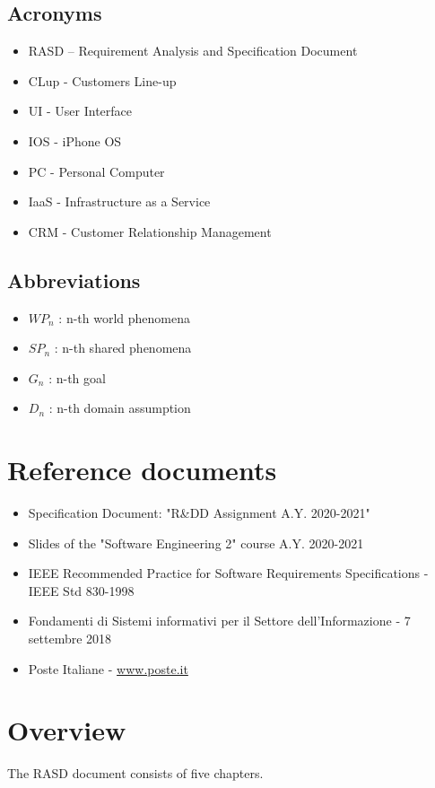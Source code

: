 \documentclass[a4paper,12pt]{book}
\begin{document}
\subsection{Acronyms}
\begin{itemize}
	\item RASD – Requirement Analysis and Specification Document
	\item CLup - Customers Line-up
	\item UI - User Interface
	\item IOS - iPhone OS
	\item PC - Personal Computer
	\item IaaS - Infrastructure as a Service
	\item CRM - Customer Relationship Management
\end{itemize}

\subsection{Abbreviations}
\begin{itemize}
	\item  $WP_n$ : n-th world phenomena
	\item  $SP_n$ : n-th shared phenomena
	\item  $G_n$ : n-th goal
	\item  $D_n$ : n-th domain assumption
\end{itemize}

\section{Reference documents} \label{Reference documents}
\begin{itemize}
	\item Specification Document: "R\&DD Assignment A.Y. 2020-2021"
	\item Slides of the "Software Engineering 2" course A.Y. 2020-2021
	\item IEEE Recommended Practice for Software Requirements Specifications - IEEE Std 830-1998
	\item  Fondamenti di Sistemi informativi per il Settore dell’Informazione - 7 settembre 2018
	\item Poste Italiane - \url{www.poste.it}
\end{itemize}
	
\section{Overview}
The RASD document consists of five chapters.
\end{document}
